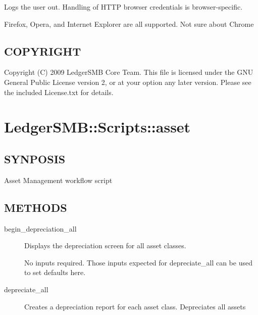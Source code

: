 \begin{description}
\begin{description}
Logs the user out.  Handling of HTTP browser credentials is browser-specific.



Firefox, Opera, and Internet Explorer are all supported.  Not sure about Chrome

\end{description}
\subsection*{COPYRIGHT\label{LedgerSMB:Scripts::login_LedgerSMB_workflow_scripts_for_managing_drafts_COPYRIGHT}}


Copyright (C) 2009 LedgerSMB Core Team.  This file is licensed under the GNU 
General Public License version 2, or at your option any later version.  Please
see the included License.txt for details.

\section{LedgerSMB::Scripts::asset\label{LedgerSMB::Scripts::asset}}




\subsection*{SYNPOSIS\label{LedgerSMB::Scripts::asset_SYNPOSIS}}


Asset Management workflow script

\subsection*{METHODS\label{LedgerSMB::Scripts::asset_METHODS}}
\begin{description}

\item[{begin\_depreciation\_all}] \mbox{}

Displays the depreciation screen for all asset classes.



No inputs required.  Those inputs expected for depreciate\_all can be used to
set defaults here.


\item[{depreciate\_all}] \mbox{}

Creates a depreciation report for each asset class.  Depreciates all assets




\end{description}
\end{description}
